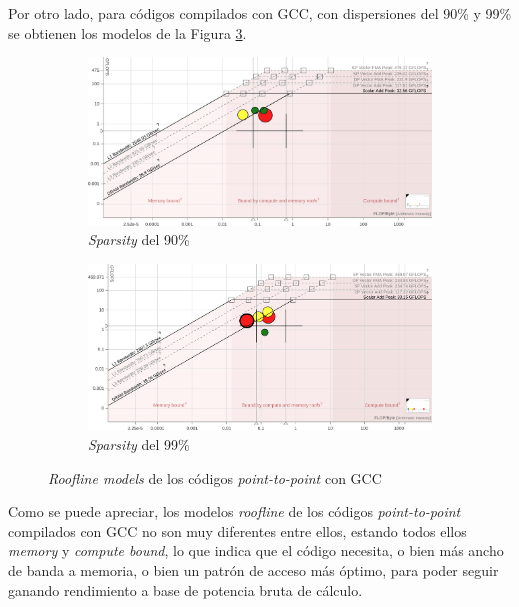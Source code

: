 Por otro lado, para códigos compilados con GCC, con dispersiones del 90\% y 99\% se obtienen los modelos de la Figura \ref{fig:rooflines_p2p_gcc_90_99}.

\begin{figure}[htpb]
    \centering
    \begin{subfigure}[b]{0.495\textwidth}
        \includegraphics[width=\textwidth]{img/rooflines/roofline_p2p_90.png}
        \caption{\textit{Sparsity} del 90\%}
        \label{fig:roofline_p2p_gcc_90}
    \end{subfigure}
    \begin{subfigure}[b]{0.495\textwidth}
        \includegraphics[width=\textwidth]{img/rooflines/roofline_p2p_99.png}
        \caption{\textit{Sparsity} del 99\%}
        \label{fig:roofline_p2p_gcc_99}
    \end{subfigure}

    \caption{\textit{Roofline models} de los códigos \textit{point-to-point} con GCC}
    \label{fig:rooflines_p2p_gcc_90_99}
\end{figure}

Como se puede apreciar, los modelos \textit{roofline} de los códigos \textit{point-to-point} compilados con GCC no son muy diferentes entre ellos, estando todos ellos \textit{memory} y \textit{compute bound}, lo que indica que el código necesita, o bien más ancho de banda a memoria, o bien un patrón de acceso más óptimo, para poder seguir ganando rendimiento a base de potencia bruta de cálculo.

